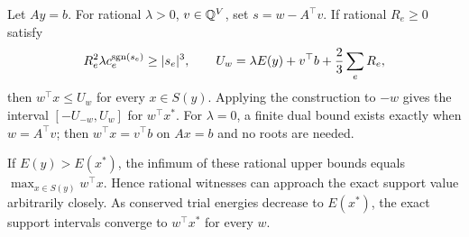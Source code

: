 \begin{theorem}
\label{thm:a-cert-support}
Let $Ay=b$. For rational $\lambda>0$, $v\in\mathbb{Q}^V$, set
$s=w-A^\top v$. If rational $R_e\ge0$ satisfy
\begin{equation}
 R_e^2\lambda c_e^{\operatorname{sgn}(s_e)}\ge |s_e|^3,
 \qquad
 U_w=\lambda E(y)+v^\top b+\frac23\sum_e R_e,
 \label{eq:a-cert-support}
\end{equation}
then $w^\top x\le U_w$ for every $x\in S(y)$.
Applying the construction to $-w$ gives the interval
$[-U_{-w},U_w]$ for $w^\top x^*$.
For $\lambda=0$, a finite dual bound exists exactly when
$w=A^\top v$; then $w^\top x=v^\top b$ on $Ax=b$ and no
roots are needed.

If $E(y)>E(x^*)$, the infimum of these rational upper bounds equals
$\max_{x\in S(y)}w^\top x$. Hence rational witnesses can approach
the exact support value arbitrarily closely. As conserved trial
energies decrease to $E(x^*)$, the exact support intervals converge
to $w^\top x^*$ for every $w$.
\end{theorem}
